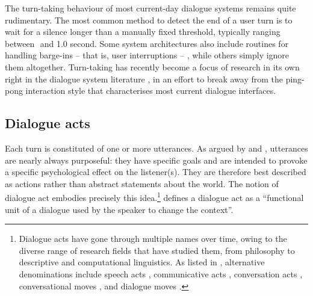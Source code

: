 The turn-taking behaviour of most current-day dialogue systems remains quite rudimentary.  The most common method to detect the end of a user turn is to wait for a silence longer than a manually fixed threshold, typically ranging between 
\textonehalf  $ $ and 1.0 second.  Some system architectures also include routines for handling barge-ins -- that is, user interruptions --  \citep{StromS00}, while others simply ignore them altogether. Turn-taking has recently become a focus of research in its own right in the dialogue system literature \citep{RauxE09,Gravano2011}, in an effort to break away from the ping-pong interaction style that characterises most current dialogue interfaces.  

\subsection{Dialogue acts}

Each turn is constituted of one or more utterances.  As argued by \cite{Austin1962} and \cite{Searle1969}, utterances are nearly always purposeful: they have specific goals and are intended to provoke a specific psychological effect on the listener(s).  They are therefore best described as actions rather than abstract statements about the world.  The notion of dialogue act embodies precisely this idea.\footnote{Dialogue acts have gone through multiple names over time, owing to the diverse range of research fields that have studied them, from philosophy to descriptive and computational linguistics.  As listed in \cite{mctear2004}, alternative denominations include speech acts \citep{Searle1969}, communicative acts \citep{allwood1976}, conversation acts \citep{TraumH92}, conversational moves \citep{sinclair1975}, and dialogue moves \citep{LarssonCEL99}.} \cite{Bunt1996} defines a dialogue act as a ``functional unit of a dialogue used by the speaker to change the context''.

